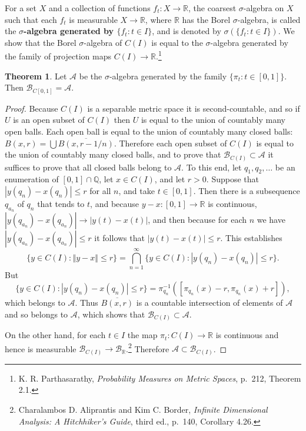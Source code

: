 \documentclass{article}
\newcommand{\norm}[1]{\left\Vert #1 \right\Vert}
\theoremstyle{definition}
\newtheorem{theorem}{Theorem}
\theoremstyle{definition}
\begin{document}
For a set $X$ and a collection of functions $f_t:X \to \mathbb{R}$,
the coarsest $\sigma$-algebra on $X$ such that each $f_t$ is measurable
$X \to \mathbb{R}$, where $\mathbb{R}$ has the Borel $\sigma$-algebra, is called
the \textbf{$\sigma$-algebra generated by $\{f_t:t \in I\}$}, and is
denoted
by $\sigma(\{f_t: t \in I\})$. 
We show that the Borel $\sigma$-algebra of $C(I)$ is equal to the $\sigma$-algebra generated by the family
of projection maps $C(I) \to \mathbb{R}$.\footnote{K. R. Parthasarathy, {\em Probability Measures on
Metric Spaces}, p.~212, Theorem 2.1.}


\begin{theorem}
Let $\mathscr{A}$ be the $\sigma$-algebra generated by the family $\{\pi_t:t \in [0,1]\}$. Then
$\mathscr{B}_{C[0,1]}=\mathscr{A}$.
\end{theorem}
\begin{proof}
Because $C(I)$ is a separable metric space it is second-countable, and so if $U$ is an open subset of $C(I)$ then $U$ is equal to the union of countably many open balls. Each open ball
is equal to the union of countably many closed balls: $B(x,r)=\bigcup \overline{B(x,r-1/n)}$. Therefore each open subset of $C(I)$ is equal to
the union of countably many closed balls, and
 to prove that $\mathscr{B}_{C(I)} \subset \mathscr{A}$ it suffices to prove that all closed balls belong to $\mathscr{A}$. 
To this end, 
let $q_1,q_2,\ldots$ be an enumeration of $[0,1] \cap \mathbb{Q}$, 
let $x \in C(I)$, and let $r>0$.  
Suppose that $|y(q_n)-x(q_n)| \leq r$ for all $n$, and take $t \in [0,1]$. Then there is a subsequence
$q_{a_n}$ of $q_n$ that tends to $t$, 
and because $y-x:[0,1] \to \mathbb{R}$ is continuous, 
$|y(q_{a_n})-x(q_{a_n})| \to |y(t)-x(t)|$, and then because for each $n$ we have
$|y(q_{a_n})-x(q_{a_n})| \leq r$ it follows that $|y(t)-x(t)| \leq r$. 
This establishes
\[
\{y \in C(I): \norm{y-x} \leq r\}
=\bigcap_{n=1}^\infty \{y \in C(I): |y(q_n)-x(q_n)| \leq r\}.
\]
But
\[
\{y \in C(I): |y(q_n)-x(q_n)| \leq r\} = \pi_{q_n}^{-1}([\pi_{q_n}(x)-r,\pi_{q_n}(x)+r]),
\]
which belongs to $\mathscr{A}$. Thus $\overline{B(x,r)}$ 
is a countable intersection of elements of $\mathscr{A}$ and so belongs to $\mathscr{A}$, which shows
that $\mathscr{B}_{C(I)} \subset \mathscr{A}$.

On the other hand, for each $t \in I$ the map $\pi_t:C(I) \to \mathbb{R}$ is continuous and hence is
measurable $\mathscr{B}_{C(I)} \to \mathscr{B}_{\mathbb{R}}$.\footnote{Charalambos D. Aliprantis
and Kim C. Border, {\em Infinite Dimensional Analysis: A Hitchhiker's Guide}, third ed., p.~140, Corollary 4.26.}
Therefore  $\mathscr{A} \subset \mathscr{B}_{C(I)}$.
\end{proof}
\end{document}
